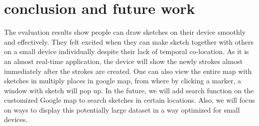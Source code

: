 \documentclass{chi2009}
\begin{document}
\section{conclusion and future work}

The evaluation results show people can draw sketches on their device smoothly
and effectively. They felt excited when they can make sketch together with
others on a small device individually despite their lack of temporal
co-location. As it is an almost real-time application, the device will show the
newly strokes almost immediately after the strokes are created. One can also
view the entire map with sketches in multiply places in google map, from where
by clicking a marker, a window with sketch will pop up. In the future, we will
add search function on the customized Google map to search sketches in certain
locations. Also, we will focus on ways to display this potentially large
dataset in a way optimized for small devices.





\newpage
\appendix

\end{document}
